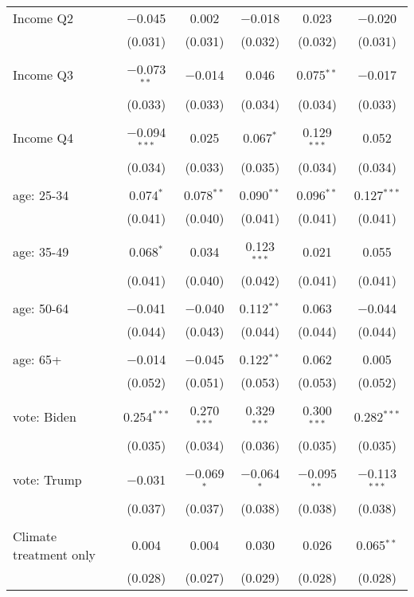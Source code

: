 \begin{tabular}{@{\extracolsep{5pt}}lccccc}
 Income Q2 & $-$0.045 & 0.002 & $-$0.018 & 0.023 & $-$0.020 \\ 
  & (0.031) & (0.031) & (0.032) & (0.032) & (0.031) \\ 
  & & & & & \\ 
 Income Q3 & $-$0.073$^{**}$ & $-$0.014 & 0.046 & 0.075$^{**}$ & $-$0.017 \\ 
  & (0.033) & (0.033) & (0.034) & (0.034) & (0.033) \\ 
  & & & & & \\ 
 Income Q4 & $-$0.094$^{***}$ & 0.025 & 0.067$^{*}$ & 0.129$^{***}$ & 0.052 \\ 
  & (0.034) & (0.033) & (0.035) & (0.034) & (0.034) \\ 
  & & & & & \\ 
 age: 25-34 & 0.074$^{*}$ & 0.078$^{**}$ & 0.090$^{**}$ & 0.096$^{**}$ & 0.127$^{***}$ \\ 
  & (0.041) & (0.040) & (0.041) & (0.041) & (0.041) \\ 
  & & & & & \\ 
 age: 35-49 & 0.068$^{*}$ & 0.034 & 0.123$^{***}$ & 0.021 & 0.055 \\ 
  & (0.041) & (0.040) & (0.042) & (0.041) & (0.041) \\ 
  & & & & & \\ 
 age: 50-64 & $-$0.041 & $-$0.040 & 0.112$^{**}$ & 0.063 & $-$0.044 \\ 
  & (0.044) & (0.043) & (0.044) & (0.044) & (0.044) \\ 
  & & & & & \\ 
 age: 65+ & $-$0.014 & $-$0.045 & 0.122$^{**}$ & 0.062 & 0.005 \\ 
  & (0.052) & (0.051) & (0.053) & (0.053) & (0.052) \\ 
  & & & & & \\ 
 vote: Biden & 0.254$^{***}$ & 0.270$^{***}$ & 0.329$^{***}$ & 0.300$^{***}$ & 0.282$^{***}$ \\ 
  & (0.035) & (0.034) & (0.036) & (0.035) & (0.035) \\ 
  & & & & & \\ 
 vote: Trump & $-$0.031 & $-$0.069$^{*}$ & $-$0.064$^{*}$ & $-$0.095$^{**}$ & $-$0.113$^{***}$ \\ 
  & (0.037) & (0.037) & (0.038) & (0.038) & (0.038) \\ 
  & & & & & \\ 
 Climate treatment only & 0.004 & 0.004 & 0.030 & 0.026 & 0.065$^{**}$ \\ 
  & (0.028) & (0.027) & (0.029) & (0.028) & (0.028) \\ 

\end{tabular}
